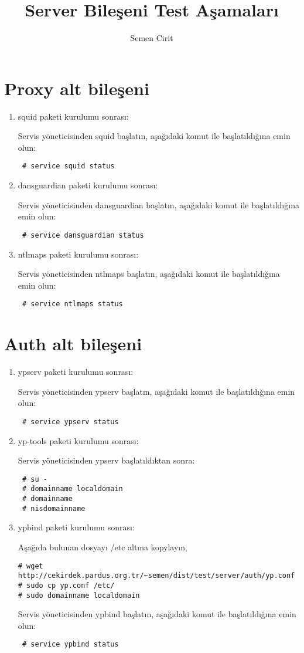\documentclass[a4paper,10pt]{article}
\title{Server Bileşeni Test Aşamaları}
\author{Semen Cirit}
\begin{document}
\maketitle
\section{Proxy alt bileşeni}
\begin{enumerate}
\item squid paketi kurulumu sonrası:

Servis yöneticisinden squid başlatın, aşağıdaki komut ile başlatıldığına emin olun:
\begin{verbatim}
 # service squid status
\end{verbatim}
 \item dansguardian paketi kurulumu sonrası:

Servis yöneticisinden dansguardian başlatın, aşağıdaki komut ile başlatıldığına emin olun:
\begin{verbatim}
 # service dansguardian status
\end{verbatim}
\item ntlmaps paketi kurulumu sonrası:

Servis yöneticisinden ntlmaps başlatın, aşağıdaki komut ile başlatıldığına emin olun:
\begin{verbatim}
 # service ntlmaps status
\end{verbatim}
\end{enumerate}


\section{Auth alt bileşeni}
\begin{enumerate}
 \item ypserv paketi kurulumu sonrası:

Servis yöneticisinden ypserv başlatın, aşağıdaki komut ile başlatıldığına emin olun:
\begin{verbatim}
 # service ypserv status
\end{verbatim}

\item yp-tools paketi kurulumu sonrası:

Servis yöneticisinden ypserv başlatıldıktan sonra:
\begin{verbatim}
 # su -
 # domainname localdomain
 # domainname
 # nisdomainname
\end{verbatim}

\item ypbind paketi kurulumu sonrası:

Aşağıda bulunan dosyayı /etc altına kopylayın,
\begin{verbatim}
# wget http://cekirdek.pardus.org.tr/~semen/dist/test/server/auth/yp.conf 
# sudo cp yp.conf /etc/
# sudo domainname localdomain
\end{verbatim}

Servis yöneticisinden ypbind başlatın, aşağıdaki komut ile başlatıldığına emin olun:
\begin{verbatim}
 # service ypbind status
\end{verbatim}

\end{enumerate}
\end{document}
